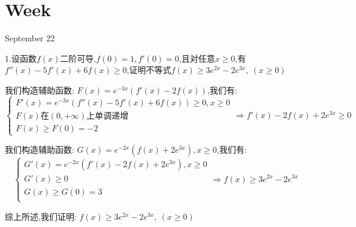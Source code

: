 \section{Week }
\textcolor{purplea}{September 22}

1.设函数$f(x)$二阶可导,$f(0)=1,f'(0)=0$,且对任意$x\geq 0$,有$f''(x)-5f'(x)+6f(x)\geq 0$,证明不等式$f(x)\geq 3e^{2x}-2e^{3x},\ (x\geq 0)$
\begin{solution}

	我们构造辅助函数:  $F(x)=e^{-3x}(f'(x)-2f(x))$,我们有:  
	$$\left\lbrace
	\begin{array}{l}
		F'(x)=e^{-3x}(f''(x)-5f'(x)+6f(x))\geq 0,x\geq 0\\
		F(x)\text{在}(0,+\infty)\text{上单调递增}\\
		F(x)\geq F(0)=-2
	\end{array}
	\right. \Rightarrow f'(x)-2f(x)+2e^{3x}\geq 0$$
	
	我们构造辅助函数:  $G(x)=e^{-2x}(f(x)+2e^{3x}),x\geq 0$,我们有:  
	$$\left\lbrace
	\begin{array}{l}
		G'(x)=e^{-2x}(f'(x)-2f(x)+2e^{3x}),x\geq 0\\
		G'(x)\geq 0\\
		G(x)\geq G(0)=3\\
	\end{array}
	\right. \Rightarrow f(x)\geq 3e^{2x}-2e^{3x}$$
	
	综上所述,我们证明:  $f(x)\geq 3e^{2x}-2e^{3x},\ (x\geq 0)$
\end{solution}

